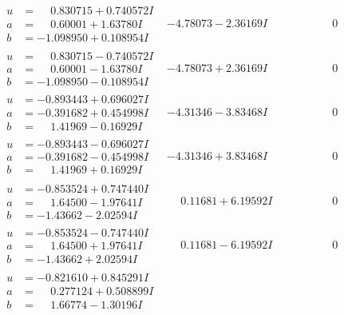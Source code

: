 \documentclass[1p]{elsarticle_modified}
\theoremstyle{definition}
\begin{document}
$$\begin{array}{c|c|c}
 \hline 
\begin{aligned}
u &= \phantom{-}0.830715 + 0.740572 I \\
a &= \phantom{-}0.60001 + 1.63780 I \\
b &= -1.098950 + 0.108954 I\end{aligned}
 & -4.78073 - 2.36169 I & \phantom{-0.000000 } 0 \\ \hline\begin{aligned}
u &= \phantom{-}0.830715 - 0.740572 I \\
a &= \phantom{-}0.60001 - 1.63780 I \\
b &= -1.098950 - 0.108954 I\end{aligned}
 & -4.78073 + 2.36169 I & \phantom{-0.000000 } 0 \\ \hline\begin{aligned}
u &= -0.893443 + 0.696027 I \\
a &= -0.391682 + 0.454998 I \\
b &= \phantom{-}1.41969 - 0.16929 I\end{aligned}
 & -4.31346 - 3.83468 I & \phantom{-0.000000 } 0 \\ \hline\begin{aligned}
u &= -0.893443 - 0.696027 I \\
a &= -0.391682 - 0.454998 I \\
b &= \phantom{-}1.41969 + 0.16929 I\end{aligned}
 & -4.31346 + 3.83468 I & \phantom{-0.000000 } 0 \\ \hline\begin{aligned}
u &= -0.853524 + 0.747440 I \\
a &= \phantom{-}1.64500 - 1.97641 I \\
b &= -1.43662 - 2.02594 I\end{aligned}
 & \phantom{-}0.11681 + 6.19592 I & \phantom{-0.000000 } 0 \\ \hline\begin{aligned}
u &= -0.853524 - 0.747440 I \\
a &= \phantom{-}1.64500 + 1.97641 I \\
b &= -1.43662 + 2.02594 I\end{aligned}
 & \phantom{-}0.11681 - 6.19592 I & \phantom{-0.000000 } 0 \\ \hline\begin{aligned}
u &= -0.821610 + 0.845291 I \\
a &= \phantom{-}0.277124 + 0.508899 I \\
b &= \phantom{-}1.66774 - 1.30196 I\end{aligned}

\end{array}$$
\end{document}
